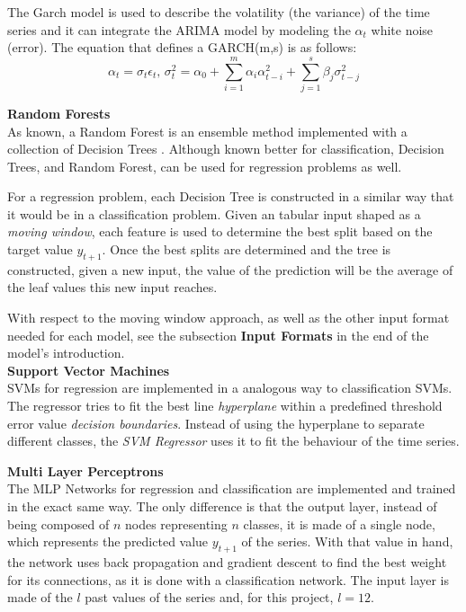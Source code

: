\documentclass[10pt,twocolumn,letterpaper]{article}
\begin{document}
The Garch model is used to describe the volatility (the variance) of the time series and it can integrate the ARIMA model by modeling the $\alpha_t$ white noise (error). The equation that defines a GARCH(m,s) is as follows:
\begin{equation}
	\alpha_t=\sigma_t\epsilon_t\mbox{,      }\sigma_t^2=\alpha_0+\sum_{i=1}^{m}\alpha_i\alpha_{t-i}^2+\sum_{j=1}^{s}\beta_j\sigma_{t-j}^2
\end{equation}

\textbf{Random Forests} \\

As known, a Random Forest is an ensemble method implemented with a collection of Decision Trees \cite{bishop2006pattern}. Although known better for classification, Decision Trees, and Random Forest, can be used for regression problems as well.

For a regression problem, each Decision Tree is constructed in a similar way that it would be in a classification problem. Given an tabular input shaped as a \textit{moving window}, each feature is used to determine the best split based on the target value $y_{t+1}$. Once the best splits are determined and the tree is constructed, given a new input, the value of the prediction will be the average of the leaf values this new input reaches.

With respect to the moving window approach, as well as the other input format needed for each model, see the subsection \textbf{Input Formats} in the end of the model's introduction. \\

\textbf{Support Vector Machines} \\

SVMs for regression are implemented in a analogous way to classification SVMs. The  regressor tries to fit  the best line \textit{hyperplane} within a predefined threshold error value \textit{decision boundaries}. Instead of using the hyperplane to separate different classes, the \textit{SVM Regressor} uses it to fit the behaviour of the time series. 


\textbf{Multi Layer Perceptrons}\\

The MLP Networks for regression and classification are implemented and trained in the exact same way. The only difference is that the output layer, instead of being composed of $n$ nodes representing $n$ classes, it is made of a single node, which represents the predicted value $y_{t+1}$ of the series. With that value in hand, the network uses back propagation and gradient descent to find the best weight for its connections, as it is done with a classification network. The input layer is made of the $l$ past values of the series and, for this project, $l=12$.\\
\end{document}
